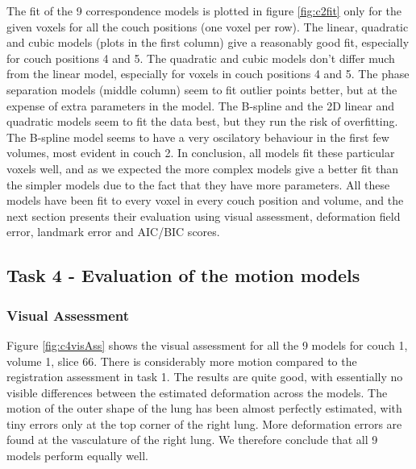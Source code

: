 \documentclass[11pt,a4paper,oneside]{report}
\begin{document}
The fit of the 9 correspondence models is plotted in figure \ref{fig:c2fit} only for the given voxels for all the couch positions (one voxel per row). The linear, quadratic and cubic models (plots in the first column) give a reasonably good fit, especially for couch positions 4 and 5. The quadratic and cubic models don't differ much from the linear model, especially for voxels in couch positions 4 and 5. The phase separation models (middle column) seem to fit outlier points better, but at the expense of extra parameters in the model. The B-spline and the 2D linear and quadratic models seem to fit the data best, but they run the risk of overfitting. The B-spline model seems to have a very oscilatory behaviour in the first few volumes, most evident in couch 2. In conclusion, all models fit these particular voxels well, and as we expected the more complex models give a better fit than the simpler models due to the fact that they have more parameters. All these models have been fit to every voxel in every couch position and volume, and the next section presents their evaluation using visual assessment, deformation field error, landmark error and AIC/BIC scores.

\subsection*{Task 4 - Evaluation of the motion models}

\subsubsection*{Visual Assessment}

Figure \ref{fig:c4visAss} shows the visual assessment for all the 9 models for couch 1, volume 1, slice 66. There is considerably more motion compared to the registration assessment in task 1. The results are quite good, with essentially no visible differences between the estimated deformation across the models. The motion of the outer shape of the lung has been almost perfectly estimated, with tiny errors only at the top corner of the right lung. More deformation errors are found at the vasculature of the right lung. We therefore conclude that all 9 models perform equally well.
\end{document}
